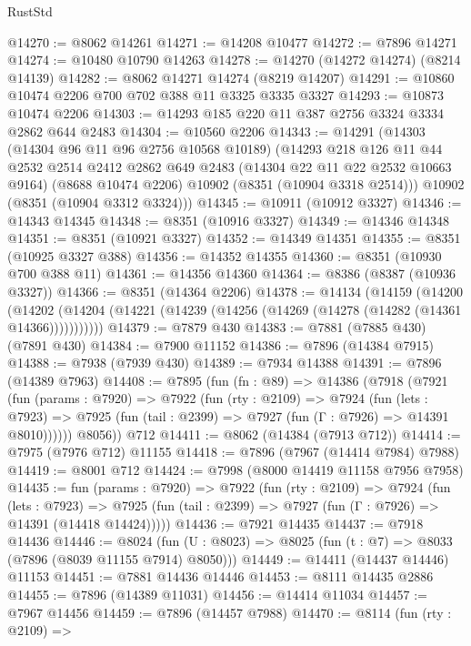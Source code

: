 \begin{lexlean}{RustStd}
\begin{coremodule}
@14270 := @8062 @14261
@14271 := @14208 @10477
@14272 := @7896 @14271
@14274 := @10480 @10790 @14263
@14278 := @14270 (@14272 @14274) (@8214 @14139)
@14282 := @8062 @14271 @14274 (@8219 @14207)
@14291 := @10860 @10474 @2206 @700 @702 @388 @11 @3325 @3335 @3327
@14293 := @10873 @10474 @2206
@14303 := @14293 @185 @220 @11 @387 @2756 @3324 @3334 @2862 @644 @2483
@14304 := @10560 @2206
@14343 := @14291
    (@14303
      (@14304 @96 @11 @96 @2756 @10568 @10189)
      (@14293
        @218
        @126
        @11
        @44
        @2532
        @2514
        @2412
        @2862
        @649
        @2483
        (@14304 @22 @11 @22 @2532 @10663 @9164)
        (@8688 @10474 @2206)
        @10902
        (@8351 (@10904 @3318 @2514)))
      @10902
      (@8351 (@10904 @3312 @3324)))
@14345 := @10911 (@10912 @3327)
@14346 := @14343 @14345
@14348 := @8351 (@10916 @3327)
@14349 := @14346 @14348
@14351 := @8351 (@10921 @3327)
@14352 := @14349 @14351
@14355 := @8351 (@10925 @3327 @388)
@14356 := @14352 @14355
@14360 := @8351 (@10930 @700 @388 @11)
@14361 := @14356 @14360
@14364 := @8386 (@8387 (@10936 @3327))
@14366 := @8351 (@14364 @2206)
@14378 := @14134
    (@14159
      (@14200
        (@14202 (@14204 (@14221 (@14239 (@14256 (@14269 (@14278 (@14282 (@14361 @14366)))))))))))
@14379 := @7879 @430
@14383 := @7881 (@7885 @430) (@7891 @430)
@14384 := @7900 @11152
@14386 := @7896 (@14384 @7915)
@14388 := @7938 (@7939 @430)
@14389 := @7934 @14388
@14391 := @7896 (@14389 @7963)
@14408 := @7895
    (fun (fn : @89) =>
    @14386
      (@7918
        (@7921
          (fun (params : @7920) =>
          @7922
            (fun (rty : @2109) =>
            @7924
              (fun (lets : @7923) =>
              @7925 (fun (tail : @2399) => @7927 (fun (Γ : @7926) => @14391 @8010))))))
        @8056))
    @712
@14411 := @8062 (@14384 (@7913 @712))
@14414 := @7975 (@7976 @712) @11155
@14418 := @7896 (@7967 (@14414 @7984) @7988)
@14419 := @8001 @712
@14424 := @7998 (@8000 @14419 @11158 @7956 @7958)
@14435 := fun (params : @7920) =>
  @7922
    (fun (rty : @2109) =>
    @7924
      (fun (lets : @7923) =>
      @7925 (fun (tail : @2399) => @7927 (fun (Γ : @7926) => @14391 (@14418 @14424)))))
@14436 := @7921 @14435
@14437 := @7918 @14436
@14446 := @8024
    (fun (U : @8023) => @8025 (fun (t : @7) => @8033 (@7896 (@8039 @11155 @7914) @8050)))
@14449 := @14411 (@14437 @14446) @11153
@14451 := @7881 @14436 @14446
@14453 := @8111 @14435 @2886
@14455 := @7896 (@14389 @11031)
@14456 := @14414 @11034
@14457 := @7967 @14456
@14459 := @7896 (@14457 @7988)
@14470 := @8114
    (fun (rty : @2109) =>

\end{coremodule}
\end{lexlean}
